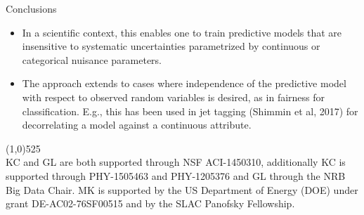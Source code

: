 \documentclass[final,unknownkeysallowed]{beamer}
\newcommand{\cmark}{\ding{51}}%
\begin{document}
\begin{frame}{}
\begin{textblock}{0.32}
\begin{block}{Conclusions \phantom{p}}
\begin{itemize}
\item[{\color{green} \cmark}] In a scientific context, this enables one to train predictive models that are insensitive to systematic uncertainties parametrized by continuous or categorical nuisance parameters.

\item[{\color{green} \cmark}] The approach extends to cases where independence of the predictive model with respect to
observed random variables is desired, {\color{red}as in fairness for
classification}. E.g., this has been used in jet tagging (Shimmin et al, 2017) for decorrelating a model against a {\color{red} continuous} attribute.
\end{itemize}


\vspace{-0.7cm}
\line(1,0){525}\\
KC and GL are both supported through NSF ACI-1450310, additionally KC is supported through PHY-1505463 and PHY-1205376 and GL through the NRB Big Data Chair. MK is supported by the US Department of Energy (DOE) under grant DE-AC02-76SF00515 and by the SLAC Panofsky Fellowship.
\end{block}




\end{textblock}




\end{frame}
\end{document}

